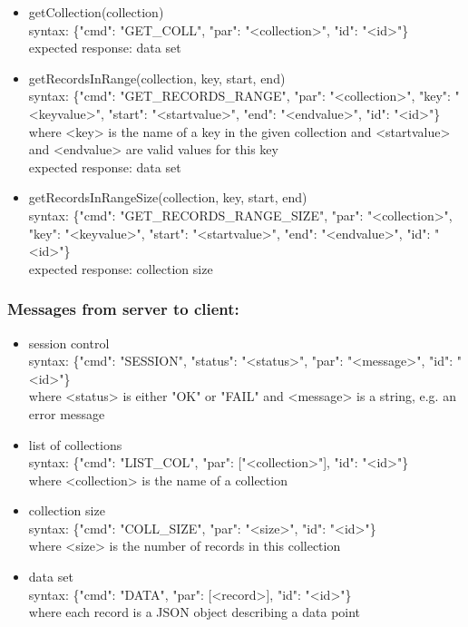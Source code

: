 \documentclass[oneside, english, final]{design}
\begin{document}
\begin{itemize}
	\item{getCollection(collection)}
	      \\
	      syntax: \{"cmd": "GET\_COLL", "par": "<collection>", "id": "<id>"\} \\
	      expected response: data set

	\item{getRecordsInRange(collection, key, start, end)}
	      \\
	      syntax: \{"cmd": "GET\_RECORDS\_RANGE", "par": "<collection>", "key": "<keyvalue>", "start": "<startvalue>", "end": "<endvalue>", "id": "<id>"\} \\
	      where <key> is the name of a key in the given collection and <startvalue> and <endvalue> are valid values for this key\\
	      expected response: data set

	\item{getRecordsInRangeSize(collection, key, start, end)}
	      \\
	      syntax: \{"cmd": "GET\_RECORDS\_RANGE\_SIZE", "par": "<collection>", "key": "<keyvalue>", "start": "<startvalue>", "end": "<endvalue>", "id": "<id>"\} \\
	      expected response: collection size

\end{itemize}

\subsubsection{Messages from server to client:}
\begin{itemize}
	\item{session control}
	      \\
	      syntax: \{"cmd": "SESSION", "status": "<status>", "par": "<message>", "id": "<id>"\} \\
	      where <status> is either "OK" or "FAIL" and <message> is a string, e.g. an error message\\

	\item{list of collections}
	      \\
	      syntax: \{"cmd": "LIST\_COL", "par": ["<collection>"], "id": "<id>"\} \\
	      where <collection> is the name of a collection\\

	\item{collection size}
	      \\
	      syntax: \{"cmd": "COLL\_SIZE", "par": "<size>", "id": "<id>"\} \\
	      where <size> is the number of records in this collection\\
	\item{data set}
	      \\
	      syntax: \{"cmd": "DATA", "par": [<record>], "id": "<id>"\} \\
	      where each record is a JSON object describing a data point
\end{itemize}
\end{document}
